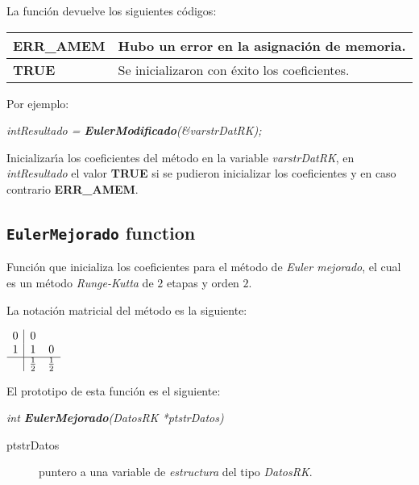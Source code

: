 La funci\'on devuelve los siguientes c\'odigos:

\begin{center}
\begin{tabular}{|l|l|}
\hline
\textbf{ERR\_AMEM} & Hubo un error en la asignaci\'on de memoria. \\
\hline
\textbf{TRUE} & Se inicializaron con \'exito los coeficientes. \\
\hline
\end{tabular}
\end{center}

Por ejemplo:

\begin{center}
\emph{intResultado = \textbf{EulerModificado}(\&varstrDatRK);}
\end{center}


Inicializar\'{\i}a los coeficientes del m\'etodo en la variable
\emph{varstrDatRK}, en \emph{intResultado} el valor \textbf{TRUE} si se pudieron
inicializar los coeficientes y en caso contrario \textbf{ERR\_AMEM}.

\subsection{\texttt{EulerMejorado} function}

Funci\'on que inicializa los coeficientes para el m\'etodo de \emph{Euler mejorado},
el cual es un m\'etodo \emph{Runge-Kutta} de $2$ etapas y orden $2$.\newline

La notaci\'on matricial del m\'etodo es la siguiente:

\begin{center}
$
\begin{array}{c|cc}
0 & 0 \\
1 & 1 & 0 \\
\hline
 & \frac{1}{2} & \frac{1}{2}
\end{array}
$
\end{center}

El prototipo de esta funci\'on es el siguiente:

\begin{center}
\emph{int \textbf{EulerMejorado}(DatosRK *ptstrDatos)}
\end{center}

\begin{description}
\item[ptstrDatos] puntero a una variable de \emph{estructura} del tipo
\emph{DatosRK}.
\end{description}


